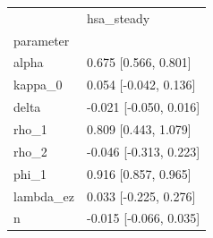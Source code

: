 \begin{tabular}{ll}
\toprule
 & hsa\_steady \\
parameter &  \\
\midrule
alpha & 0.675 [0.566, 0.801] \\
kappa\_0 & 0.054 [-0.042, 0.136] \\
delta & -0.021 [-0.050, 0.016] \\
rho\_1 & 0.809 [0.443, 1.079] \\
rho\_2 & -0.046 [-0.313, 0.223] \\
phi\_1 & 0.916 [0.857, 0.965] \\
lambda\_ez & 0.033 [-0.225, 0.276] \\
n & -0.015 [-0.066, 0.035] \\
\bottomrule
\end{tabular}
